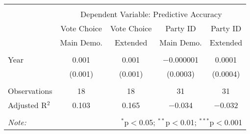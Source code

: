 
\begin{tabular}{@{\extracolsep{5pt}}lcccc} 
\\[-1.8ex]\midrule 
\midrule \\[-1.8ex] 
 & \multicolumn{4}{c}{Dependent Variable: Predictive Accuracy} \\ 
\cmidrule{2-5} 
 & Vote Choice & Vote Choice & Party ID & Party ID \\ & Main Demo. & Extended & Main Demo. & Extended \\ 
\midrule \\[-1.8ex] 
 Year & 0.001 & 0.001 & $-$0.000001 & 0.0001 \\ 
  & (0.001) & (0.001) & (0.0003) & (0.0004) \\ 
 \midrule \\[-1.8ex] 
Observations & 18 & 18 & 31 & 31 \\ 
Adjusted R$^{2}$ & 0.103 & 0.165 & $-$0.034 & $-$0.032 \\ 
\midrule 
\midrule \\[-1.8ex] 
\textit{Note:}  & \multicolumn{4}{r}{$^{*}$p$<$0.05; $^{**}$p$<$0.01; $^{***}$p$<$0.001} \\ 
\end{tabular} 
